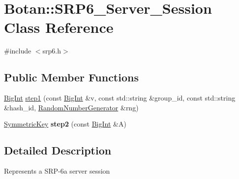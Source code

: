\hypertarget{classBotan_1_1SRP6__Server__Session}{\section{Botan\-:\-:S\-R\-P6\-\_\-\-Server\-\_\-\-Session Class Reference}
\label{classBotan_1_1SRP6__Server__Session}
}


{\ttfamily \#include $<$srp6.\-h$>$}

\subsection*{Public Member Functions}
\begin{DoxyCompactItemize}
\item 
\hyperlink{classBotan_1_1BigInt}{Big\-Int} \hyperlink{classBotan_1_1SRP6__Server__Session_a09795a3e4a85759bc5819bf3c81a61c0}{step1} (const \hyperlink{classBotan_1_1BigInt}{Big\-Int} \&v, const std\-::string \&group\-\_\-id, const std\-::string \&hash\-\_\-id, \hyperlink{classBotan_1_1RandomNumberGenerator}{Random\-Number\-Generator} \&rng)
\item 
\hypertarget{classBotan_1_1SRP6__Server__Session_add40dad96cef993f3b6139b5c11832c1}{\hyperlink{namespaceBotan_a00c78597211d5c63b63e2a57ddb96d38}{Symmetric\-Key} {\bfseries step2} (const \hyperlink{classBotan_1_1BigInt}{Big\-Int} \&A)}\label{classBotan_1_1SRP6__Server__Session_add40dad96cef993f3b6139b5c11832c1}

\end{DoxyCompactItemize}


\subsection{Detailed Description}
Represents a S\-R\-P-\/6a server session 

